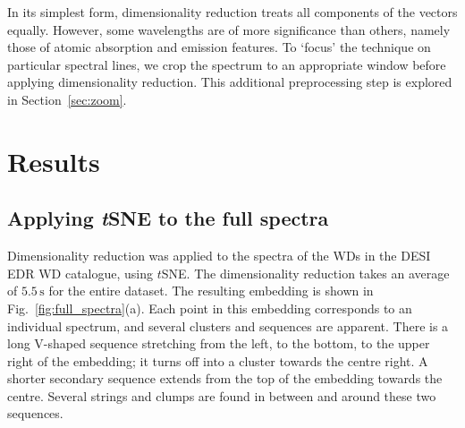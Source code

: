 \documentclass[fleqn,usenatbib]{mnras}
\begin{document}
In its simplest form, dimensionality reduction treats all components of the vectors equally.
However, some wavelengths are of more significance than others, namely those of atomic absorption and emission features.
To `focus' the technique on particular spectral lines, we crop the spectrum to an appropriate window before applying dimensionality reduction.
This additional preprocessing step is explored in Section~\ref{sec:zoom}.

\section{Results}
\label{sec:results}

\subsection{Applying \textit{t}SNE to the full spectra}
\label{sec:full_spectra}

Dimensionality reduction was applied to the spectra of the WDs in the DESI EDR WD catalogue, using $t$SNE.
The dimensionality reduction takes an average of $5.5\,\text{s}$ for the entire dataset.
The resulting embedding is shown in Fig.~\ref{fig:full_spectra}(a).
Each point in this embedding corresponds to an individual spectrum, and several clusters and sequences are apparent.
There is a long V-shaped sequence stretching from the left, to the bottom, to the upper right of the embedding; it turns off into a cluster towards the centre right.
A shorter secondary sequence extends from the top of the embedding towards the centre.
Several strings and clumps are found in between and around these two sequences.
\end{document}
